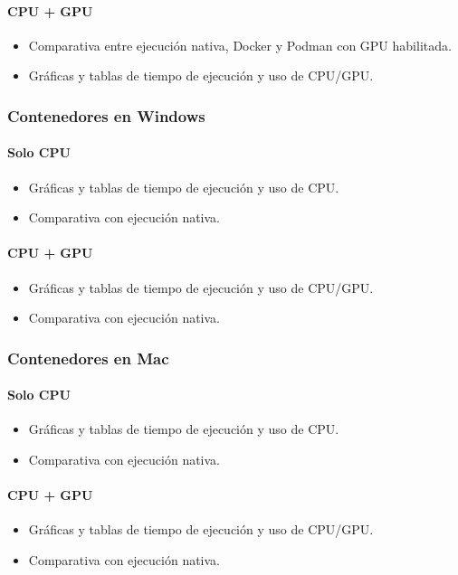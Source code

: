 \paragraph{CPU + GPU}
\begin{itemize}
    \item Comparativa entre ejecución nativa, Docker y Podman con GPU habilitada.
    \item Gráficas y tablas de tiempo de ejecución y uso de CPU/GPU.
\end{itemize}
\subsubsection{Contenedores en Windows}
\paragraph{Solo CPU}
\begin{itemize}
    \item Gráficas y tablas de tiempo de ejecución y uso de CPU.
    \item Comparativa con ejecución nativa.
\end{itemize}
\paragraph{CPU + GPU}
\begin{itemize}
    \item Gráficas y tablas de tiempo de ejecución y uso de CPU/GPU.
    \item Comparativa con ejecución nativa.
\end{itemize}
\subsubsection{Contenedores en Mac}
\paragraph{Solo CPU}
\begin{itemize}
    \item Gráficas y tablas de tiempo de ejecución y uso de CPU.
    \item Comparativa con ejecución nativa.
\end{itemize}
\paragraph{CPU + GPU}
\begin{itemize}
    \item Gráficas y tablas de tiempo de ejecución y uso de CPU/GPU.
    \item Comparativa con ejecución nativa.
\end{itemize}

